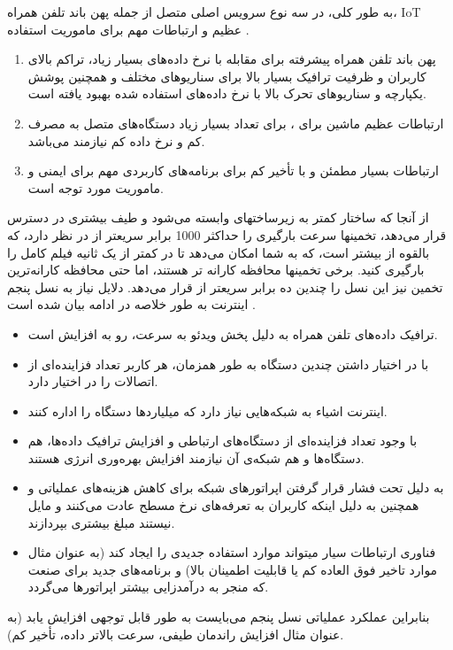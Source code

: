 به طور کلی، 
 در سه نوع سرویس اصلی متصل از جمله پهن باند تلفن همراه، IoT عظیم و ارتباطات مهم برای ماموریت استفاده ‌‌‌‌‌.
\begin{enumerate}
\item 
پهن باند تلفن همراه پیشرفته 
 برای مقابله با نرخ داده‌های بسیار زیاد، تراکم بالای کاربران و ظرفیت ترافیک بسیار بالا برای سناریوهای مختلف و همچنین پوشش یکپارچه و سناریوهای تحرک بالا با نرخ داده‌های استفاده شده بهبود یافته است.
\item
 ارتباطات  عظیم ماشین 
  برای
،
   برای تعداد بسیار زیاد دستگاه‌های متصل به مصرف کم و نرخ داده کم نیازمند می‌باشد.
\item 
ارتباطات بسیار مطمئن و با تأخیر کم
 برای برنامه‌های کاربردی مهم برای ایمنی و ماموریت
  مورد توجه است.
\end{enumerate}
 از آنجا که ساختار
 کمتر به زیرساختهای  وابسته می‌شود و طیف بیشتری در دسترس قرار می‌دهد،
 تخمینها سرعت بارگیری را حداکثر 1000 برابر سریعتر از  در نظر دارد، که بالقوه از 
بیشتر است، که به شما امکان می‌دهد تا در کمتر از یک ثانیه فیلم کامل
   را بارگیری کنید.
   برخی تخمینها محافظه کارانه تر هستند، اما حتی محافظه کارانه‌ترین تخمین نیز این نسل را چندین ده برابر سریعتر از  قرار می‌دهد.
دلایل نیاز به نسل پنجم اینترنت به طور خلاصه در ادامه بیان شده است \citep{etsi}.
\begin{itemize}
\item ترافیک داده‌های تلفن همراه به دلیل پخش ویدئو به سرعت، رو به افزایش است.
\item با در اختیار داشتن چندین دستگاه به طور همزمان، هر کاربر تعداد فزاینده‌ای از اتصالات را در اختیار دارد.
\item اینترنت اشیاء به شبکه‌هایی نیاز دارد که میلیاردها دستگاه را اداره کنند.
\item با وجود تعداد فزاینده‌ای از دستگاه‌های ارتباطی و افزایش ترافیک داده‌ها، هم دستگاه‌ها و هم شبکه‌ی  
آن
نیازمند افزایش بهره‌وری انرژی هستند.
\item 
 به دلیل تحت فشار قرار گرفتن اپراتورهای شبکه برای کاهش هزینه‌های عملیاتی و همچنین به دلیل اینکه کاربران به تعرفه‌های نرخ مسطح عادت می‌کنند و مایل نیستند مبلغ بیشتری بپردازند.
\item فناوری ارتباطات سیار میتواند موارد استفاده جدیدی را ایجاد کند (به عنوان مثال موارد تاخیر فوق العاده کم یا قابلیت اطمینان بالا) و برنامه‌های جدید برای صنعت که منجر به درآمدزایی بیشتر اپراتورها می‌گردد.
\end{itemize}
بنابراین عملکرد عملیاتی نسل پنجم می‌بایست به طور قابل توجهی افزایش یابد (به عنوان مثال افزایش راندمان طیفی، سرعت بالاتر داده، تأخیر کم).
